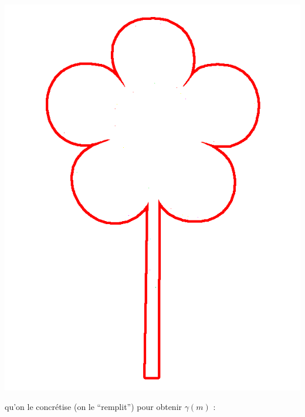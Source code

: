 \documentclass[french]{article}
\begin{document}
  \begin{center}
    \includegraphics[scale=0.19]{pictures/flower4.png}
  \end{center}
  
  qu'on le concrétise (on le ``remplit'') pour obtenir $\gamma (m)$ :
  
\end{document}
